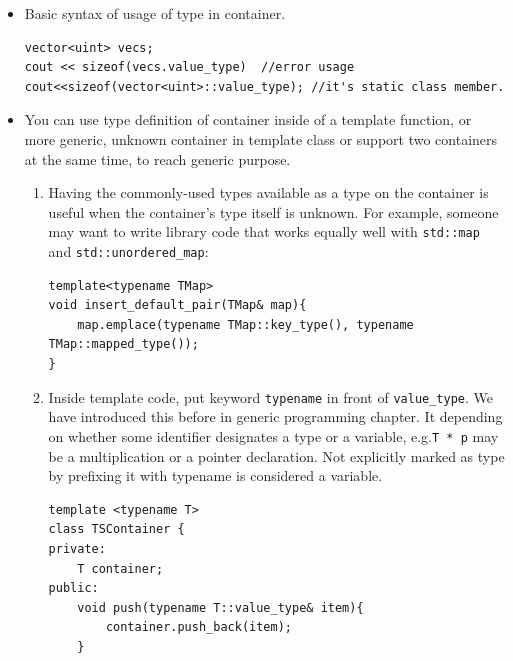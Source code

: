 \documentclass[a4paper,11pt,twoside]{book}
\begin{document}
\begin{itemize}
	\item Basic syntax of usage of type in container.
\begin{lstlisting}[numbers=none]
vector<uint> vecs;
cout << sizeof(vecs.value_type)  //error usage
cout<<sizeof(vector<uint>::value_type); //it's static class member.
\end{lstlisting}

	\item You can use type definition of container inside of a template function, or more generic, unknown container in template class or support two containers at the same time, to reach generic purpose.
	
\begin{enumerate}
	
	\item Having the commonly-used types available as a type on the container is useful when the container's type itself is unknown. For example, someone may want to write library code that works equally well with \texttt{std::map} and \texttt{std::unordered\_map}:
\begin{lstlisting}[numbers=none]
template<typename TMap>
void insert_default_pair(TMap& map){
    map.emplace(typename TMap::key_type(), typename TMap::mapped_type());
}
\end{lstlisting}

	\item Inside template code, put keyword \texttt{typename} in front of \texttt{value\_type}. We have introduced this before in generic programming chapter. It depending on whether some identifier designates a type or a variable, e.g.\texttt{T * p} may be a multiplication or a pointer declaration. Not explicitly marked as type by prefixing it with typename is considered a variable.

\begin{lstlisting}[numbers=none]
template <typename T>
class TSContainer {
private:
	T container;
public:
	void push(typename T::value_type& item){
		container.push_back(item);
	}
\end{lstlisting}

\end{enumerate}


\end{itemize}
\end{document}
